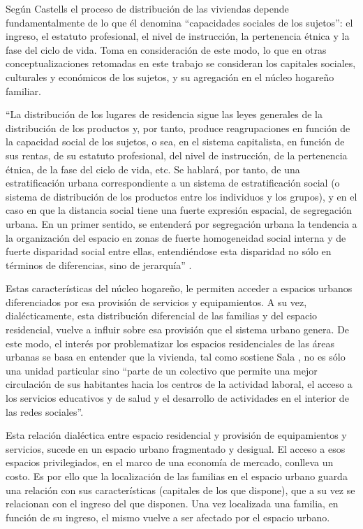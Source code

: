 	Según Castells el proceso de distribución de las viviendas depende fundamentalmente de lo que él denomina “capacidades sociales de los sujetos”: el ingreso, el estatuto profesional, el nivel de instrucción, la pertenencia étnica y la fase del ciclo de vida. Toma en consideración de este modo, lo que en otras conceptualizaciones retomadas en este trabajo se consideran los capitales sociales, culturales y económicos de los sujetos, y su agregación en el núcleo hogareño familiar.
	
	“La distribución de los lugares de residencia sigue las leyes generales de la distribución de los productos y, por tanto, produce reagrupaciones en función de la capacidad social de los sujetos, o sea, en el sistema capitalista, en función de sus rentas, de su estatuto profesional, del nivel de instrucción, de la pertenencia étnica, de la fase del ciclo de vida, etc. Se hablará, por tanto, de una estratificación urbana correspondiente a un sistema de estratificación social (o sistema de distribución de los productos entre los individuos y los grupos), y en el caso en que la distancia social tiene una fuerte expresión espacial, de segregación urbana. En un primer sentido, se entenderá por segregación urbana la tendencia a la organización del espacio en zonas de fuerte homogeneidad social interna y de fuerte disparidad social entre ellas, entendiéndose esta disparidad no sólo en términos de diferencias, sino de jerarquía” \cite[p.~205]{castells}.
	
	Estas características del núcleo hogareño, le permiten acceder a espacios urbanos diferenciados por esa provisión de servicios y equipamientos. A su vez, dialécticamente, esta distribución diferencial de las familias y del espacio residencial, vuelve a influir sobre esa provisión que el sistema urbano genera. De este modo, el interés por problematizar los espacios residenciales de las áreas urbanas se basa en entender que la vivienda, tal como sostiene Sala \citeyear{sala}, no es sólo una unidad particular sino “parte de un colectivo que permite una mejor circulación de sus habitantes hacia los centros de la actividad laboral, el acceso a los servicios educativos y de salud y el desarrollo de actividades en el interior de las redes sociales”.
	
	Esta relación dialéctica entre espacio residencial y provisión de equipamientos y servicios, sucede en un espacio urbano fragmentado y desigual. El acceso a esos espacios privilegiados, en el marco de una economía de mercado, conlleva un costo. Es por ello que la localización de las familias en el espacio urbano guarda una relación con sus características (capitales de los que dispone), que a su vez se relacionan con el ingreso del que disponen. Una vez localizada una familia, en función de su ingreso, el mismo  vuelve a ser afectado por el espacio urbano.
	
